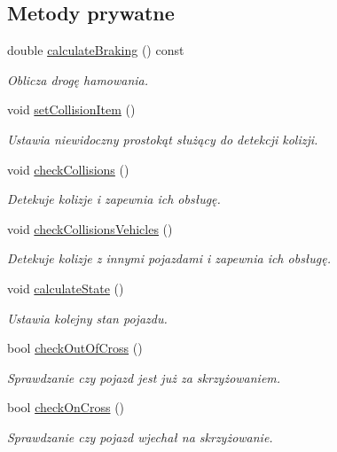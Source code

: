 \subsection*{Metody prywatne}
\begin{DoxyCompactItemize}
\item 
double \hyperlink{class_vehicle_aac21c89accf234d2c1c0229ff559dc25}{calculate\-Braking} () const 
\begin{DoxyCompactList}\small\item\em Oblicza drogę hamowania. \end{DoxyCompactList}\item 
void \hyperlink{class_vehicle_a518c4f4a17509fdb6e2031657894c346}{set\-Collision\-Item} ()
\begin{DoxyCompactList}\small\item\em Ustawia niewidoczny prostokąt służący do detekcji kolizji. \end{DoxyCompactList}\item 
void \hyperlink{class_vehicle_a8097bb51ec44c96d946a8cd1b963ab16}{check\-Collisions} ()
\begin{DoxyCompactList}\small\item\em Detekuje kolizje i zapewnia ich obsługę. \end{DoxyCompactList}\item 
void \hyperlink{class_vehicle_afb293273961ddcaa3367a9c4c1de4972}{check\-Collisions\-Vehicles} ()
\begin{DoxyCompactList}\small\item\em Detekuje kolizje z innymi pojazdami i zapewnia ich obsługę. \end{DoxyCompactList}\item 
void \hyperlink{class_vehicle_a3acdb31110e94042a96763100dccca2b}{calculate\-State} ()
\begin{DoxyCompactList}\small\item\em Ustawia kolejny stan pojazdu. \end{DoxyCompactList}\item 
bool \hyperlink{class_vehicle_a5944e3c99e136e780b488c8247c45554}{check\-Out\-Of\-Cross} ()
\begin{DoxyCompactList}\small\item\em Sprawdzanie czy pojazd jest już za skrzyżowaniem. \end{DoxyCompactList}\item 
bool \hyperlink{class_vehicle_a5702d5eba1fae66c11d744f1d7bfc71d}{check\-On\-Cross} ()
\begin{DoxyCompactList}\small\item\em Sprawdzanie czy pojazd wjechał na skrzyżowanie. \end{DoxyCompactList}\item 

\end{DoxyCompactItemize}
